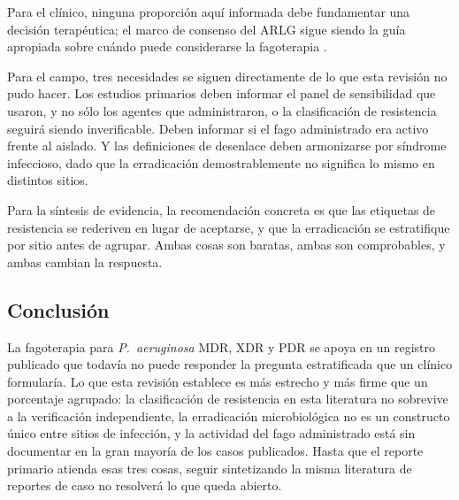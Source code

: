 \documentclass[12pt]{article}
\begin{document}
Para el clínico, ninguna proporción aquí informada debe fundamentar una decisión
terapéutica; el marco de consenso del ARLG sigue siendo la guía apropiada sobre
cuándo puede considerarse la fagoterapia \parencite{Suh2022_aac}.

Para el campo, tres necesidades se siguen directamente de lo que esta revisión no
pudo hacer. Los estudios primarios deben informar el panel de sensibilidad que
usaron, y no sólo los agentes que administraron, o la clasificación de
resistencia seguirá siendo inverificable. Deben informar si el fago administrado
era activo frente al aislado. Y las definiciones de desenlace deben armonizarse
por síndrome infeccioso, dado que la erradicación demostrablemente no significa
lo mismo en distintos sitios.

Para la síntesis de evidencia, la recomendación concreta es que las etiquetas de
resistencia se rederiven en lugar de aceptarse, y que la erradicación se
estratifique por sitio antes de agrupar. Ambas cosas son baratas, ambas son
comprobables, y ambas cambian la respuesta.

\subsection*{Conclusión}

La fagoterapia para \textit{P.\ aeruginosa} MDR, XDR y PDR se apoya en un
registro publicado que todavía no puede responder la pregunta estratificada que
un clínico formularía. Lo que esta revisión establece es más estrecho y más firme
que un porcentaje agrupado: la clasificación de resistencia en esta literatura no
sobrevive a la verificación independiente, la erradicación microbiológica no es
un constructo único entre sitios de infección, y la actividad del fago
administrado está sin documentar en la gran mayoría de los casos publicados.
Hasta que el reporte primario atienda esas tres cosas, seguir sintetizando la
misma literatura de reportes de caso no resolverá lo que queda abierto.

\clearpage
\small
\printbibliography
\end{document}
